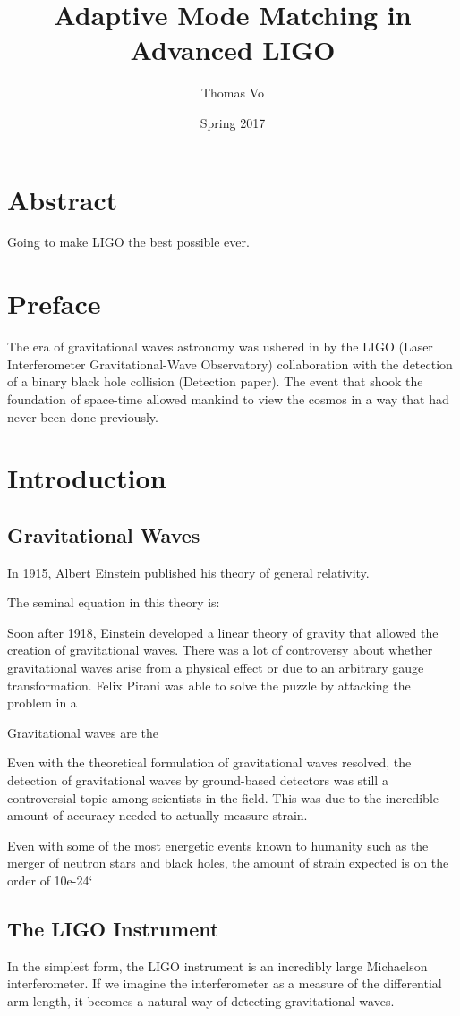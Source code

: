 \documentclass[10pt,a4paper]{book}
\title{Adaptive Mode Matching in Advanced LIGO}
\date{Spring 2017}
\author{Thomas Vo}
\begin{document}
		\chapter*{Abstract}
		Going to make LIGO the best possible ever.
	
	\maketitle
		\chapter*{Preface}
		The era of gravitational waves astronomy was ushered in by the LIGO (Laser Interferometer Gravitational-Wave Observatory) collaboration with the detection of a binary black hole collision (Detection paper).  The event that shook the foundation of space-time allowed mankind to view the cosmos in a way that had never been done previously. 
	\tableofcontents

\chapter{Introduction}
	\section{Gravitational Waves}
	In 1915, Albert Einstein published his theory of general relativity.
	
	The seminal equation in this theory is:
	
	Soon after 1918, Einstein developed a linear theory of gravity that allowed the creation of gravitational waves.  There was a lot of controversy about whether gravitational waves arise from a physical effect or due to an arbitrary gauge transformation.  Felix Pirani was able to solve the puzzle by attacking the problem in a 
	
	Gravitational waves are the 
	
	Even with the theoretical formulation of gravitational waves resolved, the detection of gravitational waves by ground-based detectors was still a controversial topic among scientists in the field.  This was due to the incredible amount of accuracy needed to actually measure strain. 
	
	Even with some of the most energetic events known to humanity such as the merger of neutron stars and black holes, the amount of strain expected is on the order of 10e-24`
	\section{The LIGO Instrument}
	In the simplest form, the LIGO instrument is an incredibly large Michaelson interferometer.  If we imagine the interferometer as a measure of the differential arm length, it becomes a natural way of detecting gravitational waves.
	
\end{document}
